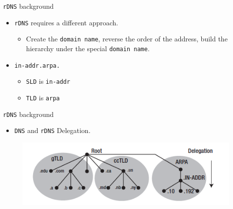 \documentclass[xcolor=table]{beamer}
\begin{document}
\begin{frame}{\texttt{rDNS} background}
  \begin{itemize}
    \item \texttt{rDNS} requires a different approach.
      \begin{itemize}
        \item Create the \texttt{domain name}, reverse the order of the address, build the hierarchy under the special \texttt{domain name}.
      \end{itemize}
    \item \texttt{in-addr.arpa.}
      \begin{itemize}
        \item \texttt{SLD} is \texttt{in-addr}
        \item \texttt{TLD} is \texttt{arpa}
      \end{itemize}
  \end{itemize}
\end{frame}

\begin{frame}{\texttt{rDNS} background}
  \begin{itemize}
    \item \texttt{DNS} and \texttt{rDNS} Delegation. 
  \end{itemize}
  \begin{figure}
    \begin{center}
      \includegraphics[width=1\linewidth]{Delegate.png}
    \end{center}
  \end{figure}
\end{frame}
\end{document}
